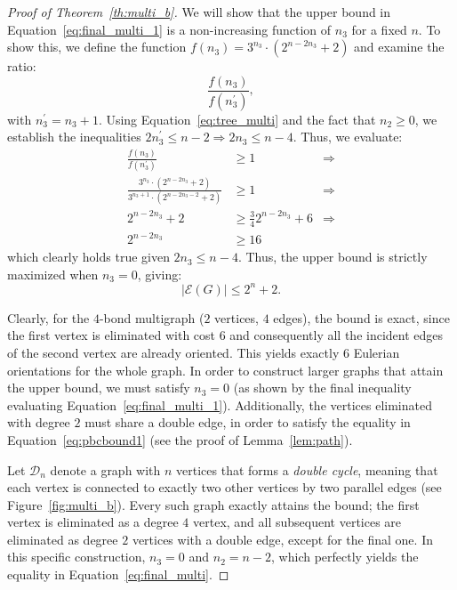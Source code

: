 \documentclass{article}
\begin{document}
\begin{proof}[Proof of Theorem~\ref{th:multi_b}]
            We will show that the upper bound in Equation~\eqref{eq:final_multi_1} is a non-increasing function of $n_3$ for a fixed $n$. To show this, we define the function $f(n_3)=3^{n_3}\cdot (2^{n-2n_3}+2)$ and examine the ratio:
            $$ \frac{f(n_3)}{f(n^\prime_3)}, $$ 
            with $n_3^\prime=n_3+1$.
            Using Equation~\eqref{eq:tree_multi} and the fact that $n_2 \geq 0$, we establish the inequalities $2n^\prime_3\leq n-2 \Rightarrow 2n_3 \leq n-4$.
            Thus, we evaluate:
            \begin{align*}
              \frac{f(n_3)}{f(n^\prime_3)} & \geq 1 &\Rightarrow  \\
              \frac{3^{n_3}\cdot (2^{n-2n_3}+2)}{3^{n_3+1}\cdot (2^{n-2n_3-2}+2)} & \geq 1 &\Rightarrow \\
              2^{n-2n_3}+2 & \geq   \frac{3}{4}2^{n-2n_3}+6 &\Rightarrow\\
              2^{n-2n_3} & \geq 16 
            \end{align*}
            which clearly holds true given $2n_3 \leq n-4$.
            Thus, the upper bound is strictly maximized when $n_3 = 0$, giving:
            \begin{equation}\label{eq:final_multi}
                |\mathcal{E}(G)| \leq 2^{n}+2.  
            \end{equation}

            Clearly, for the $4$-bond multigraph ($2$ vertices, $4$ edges), the bound is exact, since the first vertex is eliminated with cost $6$ and consequently all the incident edges of the second vertex are already oriented.
            This yields exactly $6$ Eulerian orientations for the whole graph.
            In order to construct larger graphs that attain the upper bound, we must satisfy $n_3=0$ (as shown by the final inequality evaluating Equation~\eqref{eq:final_multi_1}).
            Additionally, the vertices eliminated with degree $2$ must share a double edge, in order to satisfy the equality in Equation~\eqref{eq:pbcbound1} (see the proof of Lemma~\ref{lem:path}).
            
            Let $\mathcal{D}_n$ denote a graph with $n$ vertices that forms a \emph{double cycle}, meaning that each vertex is connected to exactly two other vertices by two parallel edges (see Figure~\ref{fig:multi_b}).
            Every such graph exactly attains the bound; the first vertex is eliminated as a degree $4$ vertex, and all subsequent vertices are eliminated as degree $2$ vertices with a double edge, except for the final one.
            In this specific construction, $n_3=0$ and $n_2=n-2$, which perfectly yields the equality in Equation~\eqref{eq:final_multi}.
        \end{proof}
\end{document}
